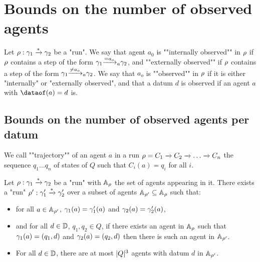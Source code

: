 \section{Bounds on the number of observed agents}
\label{sec:bounds-observed-agents}

\begin{definition}
	Let $\run : \config_1 \xrightarrow{*} \config_2$ be a "run".
	We say that agent $a_0$ is ""internally observed"" in $\run$ if $\run$ contains a step of the form $\config_1 \step{=}{a}{a_o} \config_2$, and ""externally observed"" if $\run$ contains a step of the form $\config_1 \step{\neq}{a}{a_o} \config_2$.
	We say that $a_o$ is ""observed"" in $\run$ if it is either "internally" or "externally observed", and that a datum $d$ is observed if an agent $a$ with $\dataof(a) =d$ is. 
\end{definition}

\subsection{Bounds on the number of observed agents per datum}

We call  ""trajectory"" of an agent $a$ in a run $\run=C_1 \xrightarrow{} C_2 \xrightarrow{} \ldots \xrightarrow{} C_n$ 
the sequence $q_1 \ldots q_n$ of states of $Q$ such that  $C_i(a)=q_i$ for all $i$.

\begin{lemma}
	\label{lem:agents-core-lemma}
	Let $\run : \config_1 \xrightarrow{*} \config_2$ be a "run" with $\Agentset_{\run}$ the set of agents appearing in it. There exists a "run" $\run' : \config'_1 \xrightarrow{*} \config'_2$ over a subset of agents $\Agentset_{\run'} \subseteq \Agentset_{\run}$ such that:
	\begin{itemize}
		\item for all $a \in \Agentset_{\run'}$, $\config_1(a) = \config'_1(a)$ and $\config_2(a) = \config'_2(a)$,
		
		\item and for all $d \in \Dataset$, $q_1, q_2 \in Q$, if there exists an agent in $\Agentset_{\run}$ such that $\config_1(a) = (q_1, d)$ and $\config_2(a) = (q_2, d)$ then there is such an agent in $\Agentset_{\run'}$.
		
		\item For all $d \in \Dataset$, there are at most $\size{Q}^3$ agents with datum $d$ in $\Agentset_{\run'}$.
	\end{itemize}
\end{lemma}

